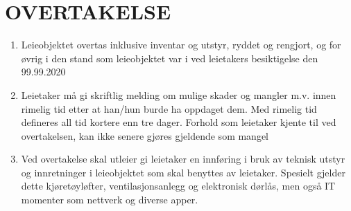 \section{OVERTAKELSE}


    \begin{enumerate}

    	\item Leieobjektet overtas inklusive inventar og utstyr, ryddet og rengjort, og for øvrig i den stand som
        leieobjektet var i ved leietakers besiktigelse den 99.99.2020

    	\item Leietaker må gi skriftlig melding om mulige skader og mangler m.v. innen rimelig tid etter at han/hun
        burde ha oppdaget dem. Med rimelig tid defineres all tid kortere enn tre dager. Forhold som leietaker kjente til ved overtakelsen, kan ikke senere gjøres gjeldende som mangel

        \item Ved overtakelse skal utleier gi leietaker en innføring i bruk av teknisk utstyr og innretninger i leieobjektet som skal benyttes av leietaker. Spesielt gjelder dette kjøretøyløfter, ventilasjonsanlegg og elektronisk dørlås, men også IT momenter som nettverk og diverse apper.


    \end{enumerate}
